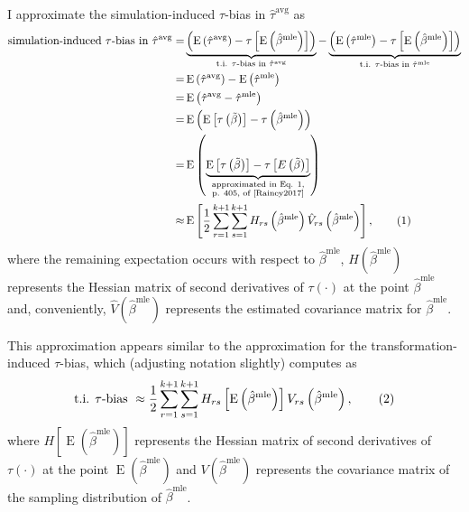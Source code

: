 \documentclass[12pt]{article}
\newcommand\numberthis{\addtocounter{equation}{1}\tag{\theequation}}
\DeclareMathOperator*{\E}{\text{E}}
\begin{document}
I approximate the simulation-induced $\tau$-bias in $\hat{\tau}^\text{avg}$ as
\begin{align*}
\text{simulation-induced $\tau$-bias in } \hat{\tau}^\text{avg} =& \underbrace{\left( \E \left( \hat{\tau}^\text{avg}\right) - \tau \left[\E \left( \hat{\beta}^\text{mle} \right) \right] \right) }_{\text{t.i. } \tau\text{-bias in }\hat{\tau}^{\text{avg}}} - \underbrace{ \left( \E \left( \hat{\tau}^\text{mle}\right) -  \tau \left[\E \left( \hat{\beta}^\text{mle} \right) \right] \right)}_{\text{t.i. } \tau\text{-bias in }\hat{\tau}^{\text{mle}}}\\
=& \E \left( \hat{\tau}^\text{avg}\right) - \E \left( \hat{\tau}^\text{mle}\right)\\
=& \E \left( \hat{\tau}^\text{avg} - \hat{\tau}^\text{mle} \right)\\
=& \E \left(     \E \left[ \tau\left( \tilde{\beta} \right) \right]      -      \tau \left( \hat{\beta}^\text{mle} \right)     \right)\\
=& \E \left(     \underbrace{\E \left[ \tau\left( \tilde{\beta} \right) \right]      -      \tau \left[ E\left(  \tilde{\beta} \right)\right]}_{\substack{\text{approximated in Eq. 1,} \\ \text{p. 405, of \cite{Rainey2017}}}}   \right)\\
\approx & \E \left[ \dfrac{1}{2} \displaystyle \sum_{r = 1}^{k+1} \sum_{s = 1}^{k+1} H_{rs}\left( \hat{\beta}^\text{mle} \right) \hat{V}_{rs} \left( \hat{\beta}^{\text{mle}} \right) \right], \numberthis \label{eqn:avg-approx}
\end{align*}
where the remaining expectation occurs with respect to $\hat{\beta}^\text{mle}$, $H\left( \hat{\beta}^\text{mle} \right)$ represents the Hessian matrix of second derivatives of $\tau(\cdot)$ at the point $\hat{\beta}^\text{mle}$ and, conveniently, $\hat{V} \left( \hat{\beta}^{\text{mle}} \right)$ represents the estimated covariance matrix for $\hat{\beta}^\text{mle}$.

This approximation appears similar to the approximation for the transformation-induced $\tau$-bias, which (adjusting notation slightly) \citet[p. 405, Eq. 1]{Rainey2017} computes as
\begin{align*}
\text{t.i. } \tau \text{-bias } \approx \dfrac{1}{2} \displaystyle \sum_{r = 1}^{k+1} \sum_{s = 1}^{k+1} H_{rs}\left[ \E \left( \hat{\beta}^\text{mle} \right) \right] V_{rs} \left( \hat{\beta}^{\text{mle}} \right), \numberthis \label{eqn:mle-approx}
\end{align*}
where $H\left[ \E \left( \hat{\beta}^\text{mle} \right) \right]$ represents the Hessian matrix of second derivatives of $\tau(\cdot)$ at the point $\E \left( \hat{\beta}^\text{mle} \right)$ and $V \left( \hat{\beta}^{\text{mle}} \right)$ represents the covariance matrix of the sampling distribution of $\hat{\beta}^\text{mle}$.
\end{document}
